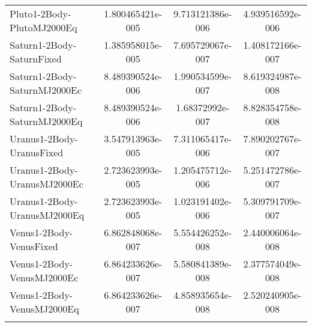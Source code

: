 \begin{table}[htbp!]
\begin{tabular}{lccc}
         Pluto1-2Body-PlutoMJ2000Eq & 1.800465421e-005 & 9.713121386e-006 & 4.939516592e-006 \\
         Saturn1-2Body-SaturnFixed & 1.385958015e-005 & 7.695729067e-007 & 1.408172166e-007 \\
         Saturn1-2Body-SaturnMJ2000Ec & 8.489390524e-006 & 1.990534599e-007 & 8.619324987e-008 \\
         Saturn1-2Body-SaturnMJ2000Eq & 8.489390524e-006 & 1.68372992e-007 & 8.828354758e-008 \\
         Uranus1-2Body-UranusFixed & 3.547913963e-005 & 7.311065417e-006 & 7.890202767e-007 \\
         Uranus1-2Body-UranusMJ2000Ec & 2.723623993e-005 & 1.205475712e-006 & 5.251472786e-007 \\
         Uranus1-2Body-UranusMJ2000Eq & 2.723623993e-005 & 1.023191402e-006 & 5.309791709e-007 \\
         Venus1-2Body-VenusFixed & 6.862848068e-007 & 5.554426252e-008 & 2.440006064e-008 \\
         Venus1-2Body-VenusMJ2000Ec & 6.864233626e-007 & 5.580841389e-008 & 2.377574049e-008 \\
         Venus1-2Body-VenusMJ2000Eq & 6.864233626e-007 & 4.858935654e-008 & 2.520240905e-008 \\
      \hline\hline
      \label{Table: MacGMAT-STK CS Parameters Set 4} 
\end{tabular}
\end{table}

